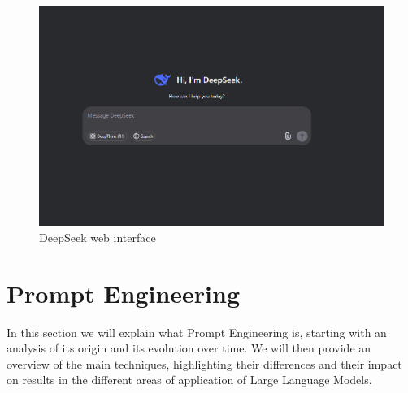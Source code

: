 \begin{figure}[h]
    \centering
    \includegraphics[width=0.7\linewidth]{Figures/DeepSeek.png}
    \caption{DeepSeek web interface}
    \label{fig:graph}
\end{figure}

\section{Prompt Engineering}
\label{sec:Prompt}
In this section we will explain what Prompt Engineering is, starting with an analysis of its origin and its evolution over time. We will then provide an overview of the main techniques, highlighting their differences and their impact on results in the different areas of application of Large Language Models.

